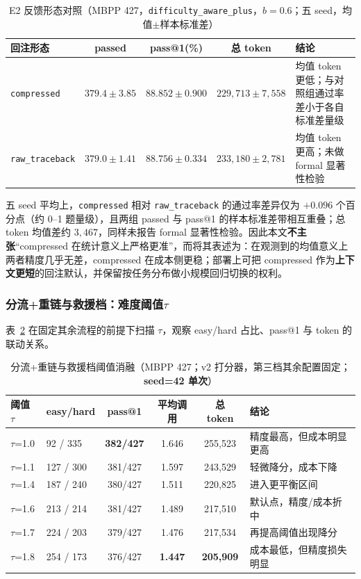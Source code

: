 \begin{table}[htbp]
\centering
\caption{E2 反馈形态对照（MBPP 427，\texttt{difficulty\_aware\_plus}，$b=0.6$；五 seed，均值$\pm$样本标准差）}
\label{tab:e2_feedback_format_5seed}
\begin{tabularx}{\textwidth}{p{3.2cm} c c c X}
\toprule
回注形态 & passed & pass@1(\%) & 总 token & 结论 \\
\midrule
\texttt{compressed} & $379.4\pm3.85$ & $88.852\pm0.900$ & $229{,}713\pm7{,}558$ & 均值 token 更低；与对照组通过率差小于各自标准差量级 \\
\texttt{raw\_traceback} & $379.0\pm1.41$ & $88.756\pm0.334$ & $233{,}180\pm2{,}781$ & 均值 token 更高；未做 formal 显著性检验 \\
\bottomrule
\end{tabularx}
\end{table}

五 seed 平均上，\texttt{compressed} 相对 \texttt{raw\_traceback} 的通过率差异仅为 $+0.096$ 个百分点（约 0--1 题量级），且两组 passed 与 pass@1 的样本标准差带相互重叠；总 token 均值差约 $3{,}467$，同样未报告 formal 显著性检验。因此本文\textbf{不主张}“compressed 在统计意义上严格更准”，而将其表述为：在观测到的均值意义上两者精度几乎无差，compressed 在成本侧更稳；部署上可把 compressed 作为\textbf{上下文更短}的回注默认，并保留按任务分布做小规模回归切换的权利。

\subsubsection{分流+重链与救援档：难度阈值\texorpdfstring{$\tau$}{tau}}

表~\ref{tab:ablation_06_threshold} 在固定其余流程的前提下扫描 $\tau$，观察 easy/hard 占比、pass@1 与 token 的联动关系。

\begin{table}[htbp]
\centering
\caption{分流+重链与救援档阈值消融（MBPP 427；v2 打分器，第三档其余配置固定；\textbf{seed=42 单次}）}
\label{tab:ablation_06_threshold}
\begin{tabularx}{\textwidth}{p{2.0cm} p{2.2cm} c c c X}
\toprule
阈值 $\tau$ & easy/hard & pass@1 & 平均调用 & 总 token & 结论 \\
\midrule
$\tau$=1.0 & 92 / 335 & \textbf{382/427} & 1.646 & 255,523 & 精度最高，但成本明显更高 \\
$\tau$=1.1 & 127 / 300 & 381/427 & 1.597 & 243,529 & 轻微降分，成本下降 \\
$\tau$=1.4 & 187 / 240 & 380/427 & 1.511 & 220,825 & 进入更平衡区间 \\
$\tau$=1.6 & 213 / 214 & 381/427 & 1.489 & 217,510 & 默认点，精度/成本折中 \\
$\tau$=1.7 & 224 / 203 & 379/427 & 1.476 & 217,534 & 再提高阈值出现降分 \\
$\tau$=1.8 & 254 / 173 & 376/427 & \textbf{1.447} & \textbf{205,909} & 成本最低，但精度损失明显 \\
\bottomrule
\end{tabularx}
\end{table}

